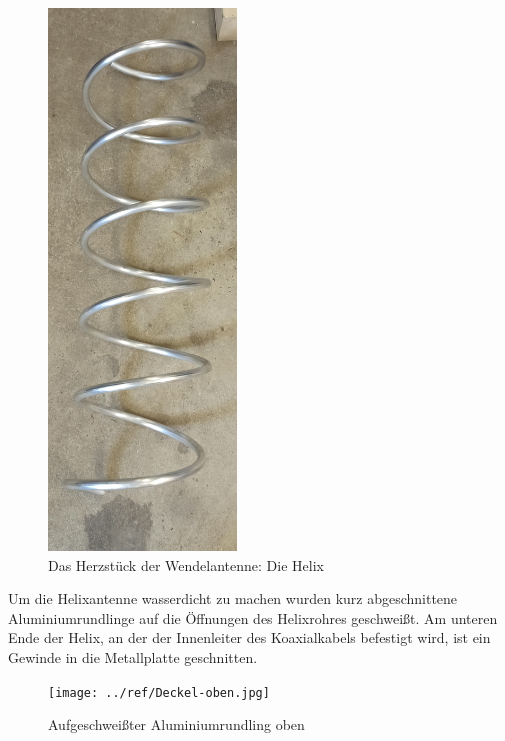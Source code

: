\begin{figure}[h!]
	\centering
	\includegraphics[width=5cm,angle=90]{../ref/Spirale.jpg}
	\caption{Das Herzstück der Wendelantenne: Die Helix}
	\label{fig:Spirale}
\end{figure}

Um die Helixantenne wasserdicht zu machen wurden kurz abgeschnittene Aluminiumrundlinge auf die Öffnungen des Helixrohres geschweißt. Am unteren Ende der Helix, an der der Innenleiter des Koaxialkabels befestigt wird, ist ein Gewinde in die Metallplatte geschnitten.

\begin{figure}[h!]
	\centering
	\texttt{[image: ../ref/Deckel-oben.jpg]}
	\caption{Aufgeschweißter Aluminiumrundling oben}
	\label{fig:Deckel-Helix-Oben}
\end{figure}

